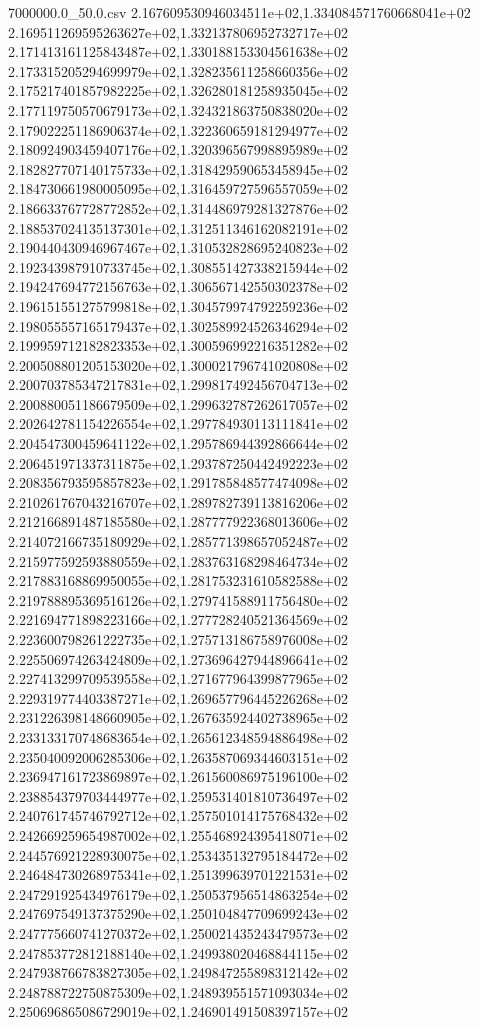 \begin{filecontents*}{7000000.0_50.0.csv}
2.167609530946034511e+02,1.334084571760668041e+02
2.169511269595263627e+02,1.332137806952732717e+02
2.171413161125843487e+02,1.330188153304561638e+02
2.173315205294699979e+02,1.328235611258660356e+02
2.175217401857982225e+02,1.326280181258935045e+02
2.177119750570679173e+02,1.324321863750838020e+02
2.179022251186906374e+02,1.322360659181294977e+02
2.180924903459407176e+02,1.320396567998895989e+02
2.182827707140175733e+02,1.318429590653458945e+02
2.184730661980005095e+02,1.316459727596557059e+02
2.186633767728772852e+02,1.314486979281327876e+02
2.188537024135137301e+02,1.312511346162082191e+02
2.190440430946967467e+02,1.310532828695240823e+02
2.192343987910733745e+02,1.308551427338215944e+02
2.194247694772156763e+02,1.306567142550302378e+02
2.196151551275799818e+02,1.304579974792259236e+02
2.198055557165179437e+02,1.302589924526346294e+02
2.199959712182823353e+02,1.300596992216351282e+02
2.200508801205153020e+02,1.300021796741020808e+02
2.200703785347217831e+02,1.299817492456704713e+02
2.200880051186679509e+02,1.299632787262617057e+02
2.202642781154226554e+02,1.297784930113111841e+02
2.204547300459641122e+02,1.295786944392866644e+02
2.206451971337311875e+02,1.293787250442492223e+02
2.208356793595857823e+02,1.291785848577474098e+02
2.210261767043216707e+02,1.289782739113816206e+02
2.212166891487185580e+02,1.287777922368013606e+02
2.214072166735180929e+02,1.285771398657052487e+02
2.215977592593880559e+02,1.283763168298464734e+02
2.217883168869950055e+02,1.281753231610582588e+02
2.219788895369516126e+02,1.279741588911756480e+02
2.221694771898223166e+02,1.277728240521364569e+02
2.223600798261222735e+02,1.275713186758976008e+02
2.225506974263424809e+02,1.273696427944896641e+02
2.227413299709539558e+02,1.271677964399877965e+02
2.229319774403387271e+02,1.269657796445226268e+02
2.231226398148660905e+02,1.267635924402738965e+02
2.233133170748683654e+02,1.265612348594886498e+02
2.235040092006285306e+02,1.263587069344603151e+02
2.236947161723869897e+02,1.261560086975196100e+02
2.238854379703444977e+02,1.259531401810736497e+02
2.240761745746792712e+02,1.257501014175768432e+02
2.242669259654987002e+02,1.255468924395418071e+02
2.244576921228930075e+02,1.253435132795184472e+02
2.246484730268975341e+02,1.251399639701221531e+02
2.247291925434976179e+02,1.250537956514863254e+02
2.247697549137375290e+02,1.250104847709699243e+02
2.247775660741270372e+02,1.250021435243479573e+02
2.247853772812188140e+02,1.249938020468844115e+02
2.247938766783827305e+02,1.249847255898312142e+02
2.248788722750875309e+02,1.248939551571093034e+02
2.250696865086729019e+02,1.246901491508397157e+02

\end{filecontents*}

